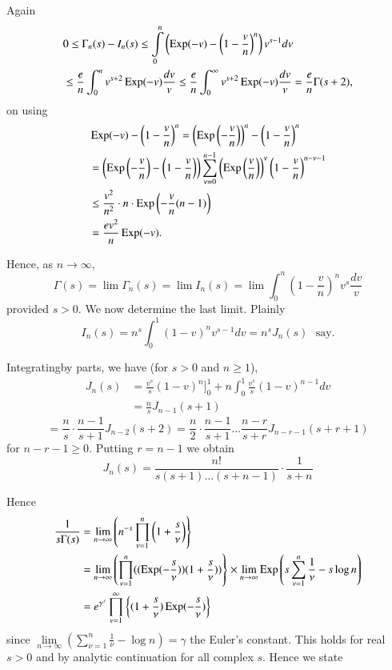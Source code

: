 Again
\begin{align*}
& 0\leq \Gamma_{n}(s)-I_{n}(s)\leq
  \int\limits^{n}_{0} \left(\operatorname{Exp}(-v)- \left(1-\frac{v}{n} \right)^{n} \right)v^{s-1}dv\\
& \leq \frac{e}{n}\int^{n}_{0}v^{s+2}\operatorname{Exp}(-v)\frac{dv}{v}\leq \frac{e}{n}\int^{\infty}_{0}v^{s+2}\operatorname{Exp}(-v)\frac{dv}{v}=\frac{e}{n}\Gamma(s+2),
\end{align*}
on using
\begin{align*}
&\operatorname{Exp}
  (-v)- \left(1-\frac{v}{n} \right)^{n}= \left(\operatorname{Exp} \left(-\frac{v}{n} \right) \right)^{n}- \left(1-\frac{v}{n} \right)^{n}\\
&=
\left(\operatorname{Exp} \left(-\frac{v}{n} \right)- \left(1-\frac{v}{n} \right) \right)\sum^{n-1}_{\nu=0} \left(\operatorname{Exp} \left(\frac{v}{n} \right) \right)^{\nu} \left(1-\frac{v}{n} \right)^{n-\nu-1}\\
&\leq \frac{v^{2}}{n^{2}}\cdot n\cdot \operatorname{Exp} \left(-\frac{v}{n}(n-1) \right)\\
&= \frac{ev^{2}}{n}\operatorname{Exp}(-v).
\end{align*}

Hence, as $n\to \infty$,
$$ 
\Gamma(s)=\lim \Gamma_{n}(s)=\lim I_{n}(s)=\lim 
\int^{n}_{0} \left(1-\frac{v}{n} \right)^{n}v^{s}\frac{dv}{v}
$$
provided $s>0$. We now determine the last limit. Plainly
$$
I_{n}(s)=n^{s}\int^{1}_{0}(1-v)^{n}v^{s-1}dv=n^{s}J_{n}(s)\text{~ say.}
$$

Integrating\pageoriginale by parts, we have (for $s>0$ and $n\geq 1$),
\begin{align*}
J_{n}(s) &=
\frac{v^{s}}{s}(1-v)^{n}]^{1}_{0}+n\int^{1}_{0}\frac{v^{s}}{s}(1-v)^{n-1}dv\\
&= \frac{n}{s}J_{n-1}(s+1)
\end{align*}
$$
=\frac{n}{s}\cdot \frac{n-1}{s+1}J_{n-2}(s+2)=\frac{n}{2}\cdot
\frac{n-1}{s+1}\ldots \frac{n-r}{s+r}J_{n-r-1}(s+r+1)
$$
for $n-r-1\geq 0$. Putting $r=n-1$ we obtain
$$
J_{n}(s)=\frac{n!}{s(s+1)\ldots (s+n-1)}\cdot \frac{1}{s+n}
$$

Hence
\begin{align*}
\frac{1}{s\Gamma(s)} &= \lim\limits_{n\to
  \infty}\left(n^{-s}\prod^{n}_{\nu=1}\left(1+\frac{s}{\nu}\right)\right\}\\
&= \lim\limits_{n\to
  \infty}\left(\prod^{n}_{\nu=1}((\operatorname{Exp}(-\frac{s}{\nu}))(1+\frac{s}{\nu}))\right\}\times
\lim\limits_{n\to
  \infty}\operatorname{Exp}\left(s\sum^{n}_{\nu=1}\frac{1}{\nu}-s\log n\right)\\
&=
e^{\gamma^{s}}\prod^{\infty}_{\nu=1}\left\{(1+\frac{s}{\nu})\operatorname{Exp}(-\frac{s}{\nu})\right\} 
\end{align*}
since $\lim\limits_{n\to
  \infty}\left(\sum\limits^{n}_{\nu=1}\frac{1}{\nu}-\log
n\right)=\gamma$ the Euler's constant. This holds for real $s>0$ and
by analytic continuation for all complex $s$. Hence we state 

